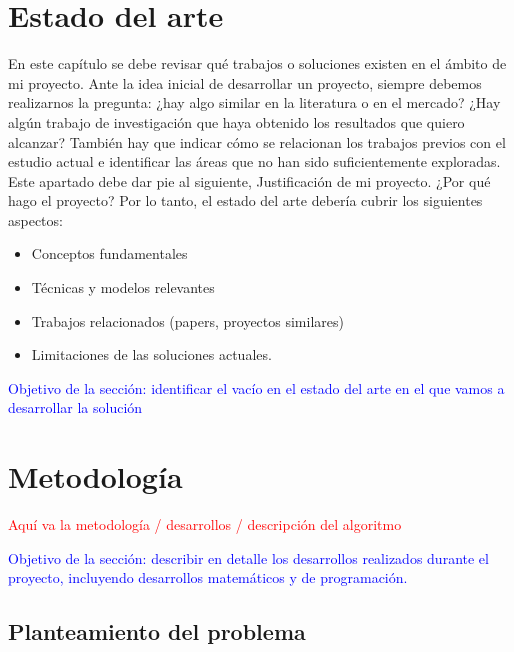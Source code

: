 \documentclass[12pt]{extarticle}
\numberwithin{equation}{section}
\begin{document}
\begin{refsection}
\section{Estado del arte}\label{sec:related} 
{\color{red}
En este capítulo se debe revisar qué trabajos o soluciones existen en el ámbito de mi proyecto. Ante la idea inicial de desarrollar un proyecto, siempre debemos realizarnos la pregunta: ¿hay algo similar en la literatura o en el mercado? ¿Hay algún trabajo de investigación que haya obtenido los resultados que quiero alcanzar?
También hay que indicar cómo se relacionan los trabajos previos con el estudio actual e identificar las áreas que no han sido suficientemente exploradas.
 Este apartado debe dar pie al siguiente, Justificación de mi proyecto. ¿Por qué hago el proyecto?
Por lo tanto, el estado del arte debería cubrir los siguientes aspectos: 

\begin{itemize}
    \item Conceptos fundamentales 
    \item Técnicas y modelos relevantes
    \item Trabajos relacionados (papers, proyectos similares)
    \item Limitaciones de las soluciones actuales.
\end{itemize}
}

\textcolor{blue}{Objetivo de la secci\'on: identificar el vac\'io en el estado del arte en el que vamos a desarrollar la soluci\'on}

\newpage


\section{Metodolog\'ia}\label{sec:methodology}

\textcolor{red}{Aqu\'i va la metodolog\'ia / desarrollos / descripci\'on del algoritmo}

\textcolor{blue}{Objetivo de la secci\'on: describir en detalle los desarrollos realizados durante el proyecto, incluyendo desarrollos matem\'aticos y de programaci\'on.}

\subsection{Planteamiento del problema}


\end{refsection}
\end{document}
